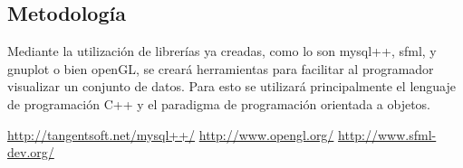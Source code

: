 \documentclass[11pt]{article}
\begin{document}
\subsection*{Metodología}
Mediante la utilización de librerías ya creadas, como lo son mysql++, sfml, y gnuplot o bien openGL, 
se creará herramientas para facilitar al programador visualizar un conjunto de datos. Para esto se utilizará principalmente el
lenguaje de programación C++ y el paradigma de programación orientada a objetos.

\begin{thebibliography}{10}
\url{http://tangentsoft.net/mysql++/}
\url{http://www.opengl.org/}
\url{http://www.sfml-dev.org/}
\end{thebibliography}
\end{document}
